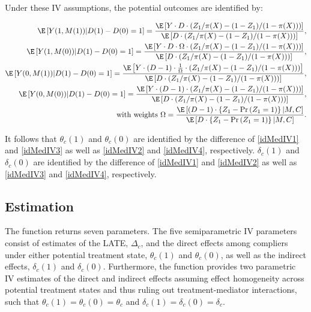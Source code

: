 \documentclass[nojss]{jss}
\begin{document}
Under these IV assumptions, the potential outcomes are identified by:

\begin{eqnarray}\label{idMedIV1}
\E\left[Y(1,M(1))|D(1)-D(0)=1\right] = \frac{\E\left[Y\cdot D \cdot \left(Z_1/\pi(X)-(1-Z_1)/(1-\pi(X))\right)\right]}{\E\left[D\cdot \left(Z_1/\pi(X)-(1-Z_1)/(1-\pi(X))\right)\right]},\\ \label{idMedIV2}
\E\left[Y(1,M(0))|D(1)-D(0)=1\right] = \frac{\E\left[Y\cdot D \cdot \Omega\cdot\left(Z_1/\pi(X)-(1-Z_1)/(1-\pi(X))\right)\right]}{\E\left[D\cdot \left(Z_1/\pi(X)-(1-Z_1)/(1-\pi(X))\right)\right]},\\ \label{idMedIV3}
\E\left[Y(0,M(1))|D(1)-D(0)=1\right] = \frac{\E\left[Y\cdot(D-1)\cdot\frac{1}{\Omega}\cdot\left(Z_1/\pi(X)-(1-Z_1)/(1-\pi(X))\right)\right]}{\E\left[D\cdot \left(Z_1/\pi(X)-(1-Z_1)/(1-\pi(X))\right)\right]},\\ \label{idMedIV4}
\E\left[Y(0,M(0))|D(1)-D(0)=1\right] = \frac{\E\left[Y\cdot(D-1)\cdot\left(Z_1/\pi(X)-(1-Z_1)/(1-\pi(X))\right)\right]}{\E\left[D\cdot \left(Z_1/\pi(X)-(1-Z_1)/(1-\pi(X))\right)\right]},\\ \label{idMedIV}
\text{with weights } \Omega = \frac{\E\left[ \left( D-1\right)\cdot\left \{ Z_{1}-\Pr \left( Z_{1}=1\right) \right \} |M,C\right] }{\E\left[D\cdot\left \{ Z_{1}-\Pr \left( Z_{1}=1\right) \right \} |M,C\right] }\text{.} \nonumber
\end{eqnarray}

It follows that $\theta_c(1)$ and $\theta_c(0)$ are identified by the difference of \eqref{idMedIV1} and \eqref{idMedIV3} as well as \eqref{idMedIV2} and \eqref{idMedIV4}, respectively. $\delta_c(1)$ and $\delta_c(0)$ are identified by the difference of \eqref{idMedIV1} and \eqref{idMedIV2} as well as \eqref{idMedIV3} and \eqref{idMedIV4}, respectively.

\subsection{Estimation}\label{est3}

The function  returns seven parameters. The five semiparametric IV parameters consist of estimates of the LATE, $\Delta_c$, and the direct effects among compliers under either potential treatment state, $\theta_c (1)$ and $\theta_c (0)$, as well as the indirect effects, $\delta_c (1)$ and $\delta_c (0)$. Furthermore, the function provides two parametric IV estimates of the direct and indirect effects assuming effect homogeneity across potential treatment states and thus ruling out treatment-mediator interactions, such that $\theta_c (1)=\theta_c (0)=\theta_c$ and $\delta_c (1)=\delta_c (0)=\delta_c$.
\end{document}
